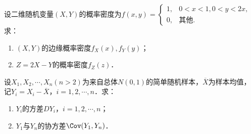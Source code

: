 \documentclass[plain,noanswer,medmath]{../../template/jnuexam}
\begin{document}
\begin{problem}[points=9]
设二维随机变量$(X,Y)$的概率密度为$f(x,y) = \begin{cases}
  1, & 0 < x < 1,0 < y < 2x, \\
  0, & \text{其他}.
\end{cases}$ 求：
\begin{enumerate}
\item $(X,Y)$的边缘概率密度$f_X(x),f_Y(y)$；
\item $Z = 2X - Y$的概率密度$f_Z(z)$．
\end{enumerate}
\end{problem}


\begin{problem}[points=9]
设$X_1,X_2, \cdots ,X_n(n > 2)$为来自总体$N(0,1)$的简单随机样本，$\overline{X}$为样本均值，
记$Y_i = X_i - \overline{X}$，$i = 1,2, \cdots ,n$．求：
\begin{enumerate}
\item $Y_i$的方差$DY_i$，$i = 1,2, \cdots ,n$；
\item $Y_1$与$Y_n$的协方差$\Cov (Y_1,Y_n)$．
\end{enumerate}
\end{problem}
\end{document}
